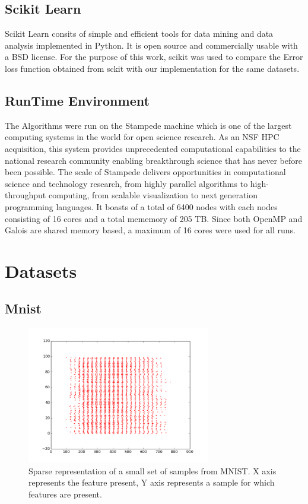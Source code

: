 \documentclass{sigplanconf}
\begin{document}
\subsection{Scikit Learn}
Scikit Learn \cite{scikit} consits of simple and efficient tools for data mining and data analysis implemented in Python. It is open source and commercially usable with a BSD license. For the purpose of this work, scikit was used to compare the Error loss function obtained from sckit with our implementation for the same datasets.

\subsection{RunTime Environment}
The Algorithms were run on the Stampede machine which is one of the largest computing systems in the world for open science research. As an NSF HPC acquisition, this system provides unprecedented computational capabilities to the national research community enabling breakthrough science that has never before been possible. The scale of Stampede delivers opportunities in computational science and technology research, from highly parallel algorithms to high-throughput computing, from scalable visualization to next generation programming languages. It boasts of a total of 6400 nodes with each nodes consisting of 16 cores and a total mememory of 205 TB. Since both OpenMP and Galois are shared memory based, a maximum of 16 cores were used for all runs.

\section{Datasets}
\subsection{Mnist}
\begin{figure}[ht!]
\centering
\includegraphics[width=80mm]{mnist_scatter.png}
\caption{Sparse representation of a small set of samples from MNIST. X axis represents the feature present, Y axis represents a sample for which features are present. }
\label{overflow}
\end{figure}
\end{document}
